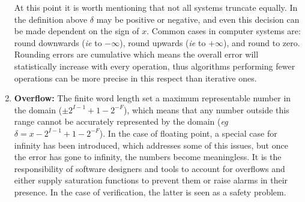 \documentclass[runningheads,a4paper]{llncs}
\begin{document}
\begin{enumerate}
At this point it is worth mentioning that not all systems truncate equally. In the definition above $\delta$ may be positive
or negative, and even this decision can be made dependent on the sign of $x$. Common cases in computer systems are:
round downwards (\emph{ie} to $-\infty$), round upwards (\emph{ie} to $+\infty$), and round to zero.
Rounding errors are cumulative which means the overall error will statistically increase with every operation, thus algorithms
performing fewer operations can be more precise in this respect than iterative ones. 
\item {\bf Overflow:}
  The finite word length set a
maximum representable number in the domain ($\pm 2^{I-1}+1-2^{-F}$), which means that any number outside this range
cannot be accurately represented by the domain (\emph{eg} $\delta=x-2^{I-1}+1-2^{-F}$). In the case of floating point, a special
case for infinity has been introduced, which addresses some of this issues, but once the error has gone to infinity, the numbers
become meaningless. It is the responsibility of software designers and tools to account for overflows and either supply saturation
functions to prevent them or raise alarms in their presence. In the case of verification, the latter is seen as a safety problem.
\end{enumerate}

\end{document}
